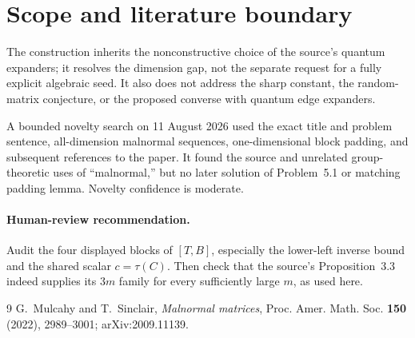 \documentclass[11pt]{article}
\begin{document}
\section{Scope and literature boundary}

The construction inherits the nonconstructive choice of the source's quantum
expanders; it resolves the dimension gap, not the separate request for a
fully explicit algebraic seed.  It also does not address the sharp constant,
the random-matrix conjecture, or the proposed converse with quantum edge
expanders.

A bounded novelty search on 11 August 2026 used the exact title and problem
sentence, all-dimension malnormal sequences, one-dimensional block padding,
and subsequent references to the paper.  It found the source and unrelated
group-theoretic uses of ``malnormal,'' but no later solution of Problem~5.1 or
matching padding lemma.  Novelty confidence is moderate.

\paragraph{Human-review recommendation.}
Audit the four displayed blocks of $[T,B]$, especially the lower-left inverse
bound and the shared scalar $c=\tau(C)$.  Then check that the source's
Proposition~3.3 indeed supplies its $3m$ family for every sufficiently large
$m$, as used here.

\begin{thebibliography}{9}
G.~Mulcahy and T.~Sinclair,
\emph{Malnormal matrices},
Proc. Amer. Math. Soc. \textbf{150} (2022), 2989--3001;
arXiv:2009.11139.
\end{thebibliography}
\end{document}
